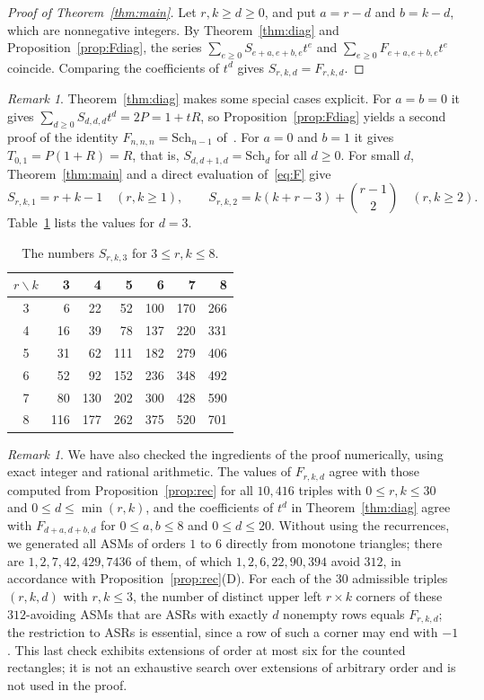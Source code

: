 \documentclass{amsart}
\theoremstyle{definition}
\theoremstyle{remark}
\newtheorem{remark}[theorem]{Remark}
\numberwithin{equation}{section}
\newcommand{\Sch}{\mathrm{Sch}}
\begin{document}
\begin{proof}[Proof of Theorem~\ref{thm:main}]
Let $r,k\ge d\ge0$, and put $a=r-d$ and $b=k-d$, which are nonnegative integers. By Theorem~\ref{thm:diag} and Proposition~\ref{prop:Fdiag}, the series $\sum_{e\ge0}S_{e+a,e+b,e}t^e$ and $\sum_{e\ge0}F_{e+a,e+b,e}t^e$ coincide. Comparing the coefficients of $t^d$ gives $S_{r,k,d}=F_{r,k,d}$.
\end{proof}

\begin{remark}\label{rem:special}
Theorem~\ref{thm:diag} makes some special cases explicit. For $a=b=0$ it gives $\sum_{d\ge0}S_{d,d,d}t^d=2P=1+tR$, so Proposition~\ref{prop:Fdiag} yields a second proof of the identity $F_{n,n,n}=\Sch_{n-1}$ of~\cite[p.~9]{HKL}. For $a=0$ and $b=1$ it gives $T_{0,1}=P(1+R)=R$, that is, $S_{d,d+1,d}=\Sch_d$ for all $d\ge0$. For small $d$, Theorem~\ref{thm:main} and a direct evaluation of~\eqref{eq:F} give
\[
S_{r,k,1}=r+k-1\quad(r,k\ge1),\qquad S_{r,k,2}=k(k+r-3)+\binom{r-1}{2}\quad(r,k\ge2).
\]
Table~\ref{tab:d3} lists the values for $d=3$.
\end{remark}

\begin{table}[ht]
\caption{The numbers $S_{r,k,3}$ for $3\le r,k\le8$.}\label{tab:d3}
\centering
\begin{tabular}{c rrrrrr}
\toprule
$r\backslash k$ & 3 & 4 & 5 & 6 & 7 & 8\\
\midrule
3 & 6 & 22 & 52 & 100 & 170 & 266\\
4 & 16 & 39 & 78 & 137 & 220 & 331\\
5 & 31 & 62 & 111 & 182 & 279 & 406\\
6 & 52 & 92 & 152 & 236 & 348 & 492\\
7 & 80 & 130 & 202 & 300 & 428 & 590\\
8 & 116 & 177 & 262 & 375 & 520 & 701\\
\bottomrule
\end{tabular}
\end{table}

\begin{remark}\label{rem:checks}
We have also checked the ingredients of the proof numerically, using exact integer and rational arithmetic. The values of $F_{r,k,d}$ agree with those computed from Proposition~\ref{prop:rec} for all $10{,}416$ triples with $0\le r,k\le30$ and $0\le d\le\min(r,k)$, and the coefficients of $t^d$ in Theorem~\ref{thm:diag} agree with $F_{d+a,d+b,d}$ for $0\le a,b\le8$ and $0\le d\le20$. Without using the recurrences, we generated all ASMs of orders $1$ to $6$ directly from monotone triangles; there are $1,2,7,42,429,7436$ of them, of which $1,2,6,22,90,394$ avoid $312$, in accordance with Proposition~\ref{prop:rec}(D). For each of the $30$ admissible triples $(r,k,d)$ with $r,k\le3$, the number of distinct upper left $r\times k$ corners of these $312$-avoiding ASMs that are ASRs with exactly $d$ nonempty rows equals $F_{r,k,d}$; the restriction to ASRs is essential, since a row of such a corner may end with $-1$. This last check exhibits extensions of order at most six for the counted rectangles; it is not an exhaustive search over extensions of arbitrary order and is not used in the proof.
\end{remark}
\end{document}
